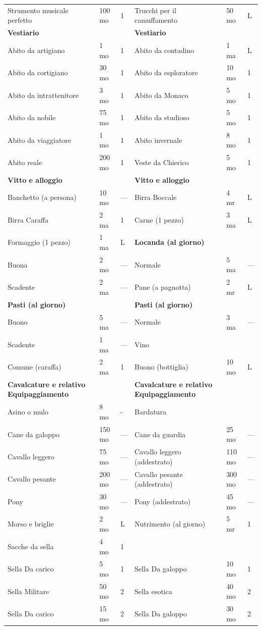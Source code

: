 \documentclass[a4paper,11pt,twoside,openany]{book}
\begin{document}
{\begin{longtable}{|L{4cm} |k{1.5cm} |k{1.5cm}|L{5cm} |k{1.5cm} |k{1.5cm}|}
Strumento musicale perfetto&100 mo&1&	Trucchi per il camuffamento&50 mo&L\\
\textbf{Vestiario}&&&\textbf{Vestiario}&&\\
Abito da artigiano&1 mo&1&	Abito da contadino&1 ma&L\\
Abito da cortigiano&30 mo&1&	Abito da esploratore&10 mo&1\\
Abito da intrattenitore&3 mo&1&	Abito da Monaco&5 mo&1\\
Abito da nobile&75 mo&1&	Abito da studioso&5 mo&1\\
Abito da viaggiatore&1 mo&1&	Abito invernale&8 mo&1\\
Abito reale&200 mo&1&	Veste da Chierico&5 mo&1\\
\textbf{Vitto e alloggio}&&&	\textbf{Vitto e alloggio}&&\\
Banchetto (a persona)&10 mo&—&	Birra Boccale&4 mr&L\\
Birra Caraffa&2 ma&1&	Carne (1 pezzo)&3 ma&L\\
Formaggio (1 pezzo)&1 ma&L&\textbf{Locanda (al giorno)}&&\\
Buona&2 mo&—&	Normale&5 ma&—\\
Scadente&2 ma&—&	Pane (a pagnotta)&2 mr&L\\
\textbf{Pasti (al giorno)}&&&\textbf{Pasti (al giorno)}&&\\
Buono&5 ma&—&	Normale&3 ma&—\\
Scadente&1 ma&—&	Vino&&\\
Comune (caraffa)&2 ma&1&	Buono (bottiglia)&10 mo&L\\
\textbf{Cavalcature e relativo Equipaggiamento}&&&\textbf{Cavalcature e relativo Equipaggiamento}&&\\
Asino o mulo&8 mo&-&	Bardatura&&\\
Cane da galoppo&150 mo&—&	Cane da guardia&25 mo&—\\
Cavallo leggero&75 mo&—&	Cavallo leggero (addestrato)&110 mo&—\\
Cavallo pesante&200 mo&—&	Cavallo pesante (addestrato)&300 mo&—\\
Pony&30 mo&—&	Pony (addestrato)&45 mo&—\\
Morso e briglie&2 mo&L&	Nutrimento (al giorno)&5 mr&1\\
Sacche da sella&4 mo&1&&&\\
Sella Da carico&5 mo&1&	Sella Da galoppo&10 mo&1\\
Sella Militare&50 mo&2&	Sella esotica &40 mo&2\\
Sella Da carico&15 mo&2&Sella Da galoppo&30 mo&2\\

\end{longtable}}
\end{document}
